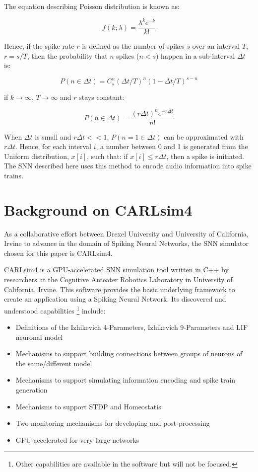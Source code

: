 \documentclass[11pt]{article}  %
\begin{document}
The equation describing Poisson distribution is known as:

\begin{equation}
	f(k; \lambda) = \frac{\lambda^k e^{-k}}{k!}
	\label{eq3}
\end{equation}

Hence, if the spike rate $r$ is defined as the number of spikes $s$ over an interval $T$, $r = s/T$, then the probability that $n$ spikes ($n < s$) happen in a sub-interval $\Delta t$ is:
	
\begin{equation}
	P(n \in \Delta t) = C^n_s(\Delta t/T)^n(1- \Delta t/T)^{s-n}
	\label{eq4}
\end{equation}

if $k \rightarrow \infty$, $T \rightarrow \infty$ and $r$ stays constant:

\begin{equation}
	P(n \in \Delta t) = \frac{(r\Delta t)^n e^{-r\Delta t}}{n!}
	\label{eq5}
\end{equation}

When $\Delta t$ is small and $r\Delta t << 1$, $P(n=1 \in \Delta t)$ can be approximated with $r\Delta t$. Hence, for each interval $i$, a number between 0 and 1 is generated from the Uniform distribution, $x[i]$, such that: if $x[i] \le r\Delta t$, then a spike is initiated. The SNN described here uses this method to encode audio information into spike trains.

\section{Background on CARLsim4}
\label{bg_carlsim4}

As a collaborative effort between Drexel University and University of California, Irvine to advance in the domain of Spiking Neural Networks, the SNN simulator chosen for this paper is CARLsim4. 

CARLsim4 is a GPU-accelerated SNN simulation tool written in C++ by researchers at the Cognitive Anteater Robotics Laboratory in University of California, Irvine. This software provides the basic underlying framework to create an application using a Spiking Neural Network. Its discovered and understood capabilities \footnote{Other capabilities are available in the software but will not be focused.} include:

\begin{itemize}
	\item Definitions of the Izhikevich 4-Parameters, Izhikevich 9-Parameters and LIF neuronal model
	\item Mechanisms to support building connections between groups of neurons of the same/different model
	\item Mechanisms to support simulating information encoding and spike train generation 
	\item Mechanisms to support STDP and Homeostatis
	\item Two monitoring mechanisms for developing and post-processing
	\item GPU accelerated for very large networks
\end{itemize}
\end{document}
